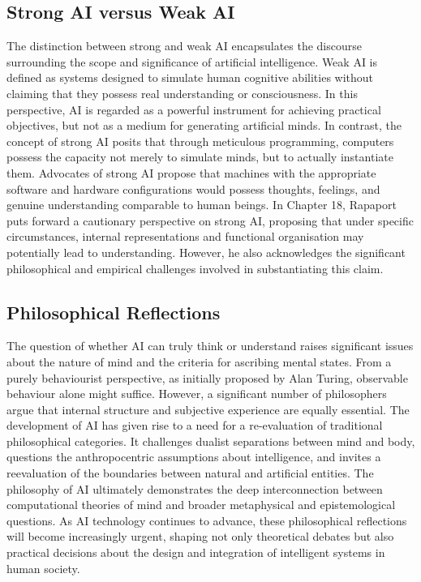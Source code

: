 \documentclass[runningheads]{llncs}
\begin{document}
\subsection{Strong AI versus Weak AI}
%
The distinction between strong and weak AI encapsulates the discourse surrounding the scope and significance of artificial intelligence. Weak AI is defined as systems designed to simulate human cognitive abilities without claiming that they possess real understanding or consciousness. In this perspective, AI is regarded as a powerful instrument for achieving practical objectives, but not as a medium for generating artificial minds.
In contrast, the concept of strong AI posits that through meticulous programming, computers possess the capacity not merely to simulate minds, but to actually instantiate them. Advocates of strong AI propose that machines with the appropriate software and hardware configurations would possess thoughts, feelings, and genuine understanding comparable to human beings.
In Chapter 18, Rapaport puts forward a cautionary perspective on strong AI, proposing that under specific circumstances, internal representations and functional organisation may potentially lead to understanding. However, he also acknowledges the significant philosophical and empirical challenges involved in substantiating this claim.
%
%
\subsection{Philosophical Reflections}
%
The question of whether AI can truly think or understand raises significant issues about the nature of mind and the criteria for ascribing mental states. From a purely behaviourist perspective, as initially proposed by Alan Turing, observable behaviour alone might suffice. However, a significant number of philosophers argue that internal structure and subjective experience are equally essential.
The development of AI has given rise to a need for a re-evaluation of traditional philosophical categories. It challenges dualist separations between mind and body, questions the anthropocentric assumptions about intelligence, and invites a reevaluation of the boundaries between natural and artificial entities.
The philosophy of AI ultimately demonstrates the deep interconnection between computational theories of mind and broader metaphysical and epistemological questions. As AI technology continues to advance, these philosophical reflections will become increasingly urgent, shaping not only theoretical debates but also practical decisions about the design and integration of intelligent systems in human society.
%
%
%
%
%
\end{document}
